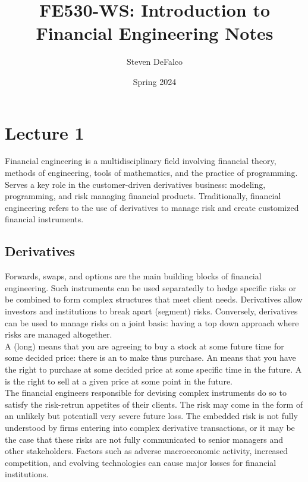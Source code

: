 \documentclass{article}
\title{FE530-WS: Introduction to Financial Engineering Notes}
\author{Steven DeFalco}
\date{Spring 2024}
\begin{document}
\maketitle
\tableofcontents
\newpage


\section{Lecture 1}

Financial engineering is a multidisciplinary field involving financial theory, methods of engineering, tools of mathematics, and the practice of programming. Serves a key role in the customer-driven derivatives business: modeling, programming, and risk managing financial products. Traditionally, financial engineering refers to the use of derivatives to manage risk and create customized financial instruments. 

\subsection{Derivatives}

Forwards, swaps, and options are the main building blocks of financial engineering. Such instruments can be used separatedly to hedge specific risks or be combined to form complex structures that meet client needs. Derivatives allow investors and institutions to break apart (segment) risks. Conversely, derivatives can be used to manage risks on a joint basis: having a top down approach where risks are managed altogether. \\

A  (long) means that you are agreeing to buy a stock at some future time for some decided price: there is an  to make thus purchase. An  means that you have the right to purchase at some decided price at some specific time in the future. A  is the right to sell at a given price at some point in the future. \\ 

The financial engineers responsible for devising complex instruments do so to satisfy the risk-retrun appetites of their clients. The risk may come in the form of an unlikely but potentiall very severe future loss. The embedded risk is not fully understood by firms entering into complex derivative transactions, or it may be the case that these risks are not fully communicated to senior managers and other stakeholders. Factors such as adverse macroeconomic activity, increased competition, and evolving technologies can cause major losses for financial institutions. 
\end{document}
